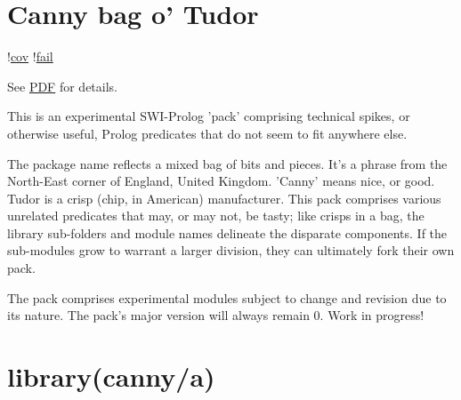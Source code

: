 
\chapter{Canny bag o' Tudor}

!\href{https://shields.io/endpoint?url=https://gist.githubusercontent.com/royratcliffe/ec92ac84832950815861d35c2f661953/raw/cov.json}{cov}
!\href{https://shields.io/endpoint?url=https://gist.githubusercontent.com/royratcliffe/ec92ac84832950815861d35c2f661953/raw/fail.json}{fail}

See \href{https://github.com/royratcliffe/canny_tudor/blob/main/man/canny_tudor.pdf}{PDF} for details.

This is an experimental SWI-Prolog 'pack' comprising technical spikes, or
otherwise useful, Prolog predicates that do not seem to fit anywhere else.

The package name reflects a mixed bag of bits and pieces. It's a phrase from the
North-East corner of England, United Kingdom. 'Canny' means nice, or good. Tudor
is a crisp (chip, in American) manufacturer. This pack comprises various
unrelated predicates that may, or may not, be tasty; like crisps in a bag, the
library sub-folders and module names delineate the disparate components. If the
sub-modules grow to warrant a larger division, they can ultimately fork their
own pack.

The pack comprises experimental modules subject to change and revision
due to its nature. The pack's major version will always remain 0.
Work in progress!\chapter{library(canny/a)}\label{sec:a}

